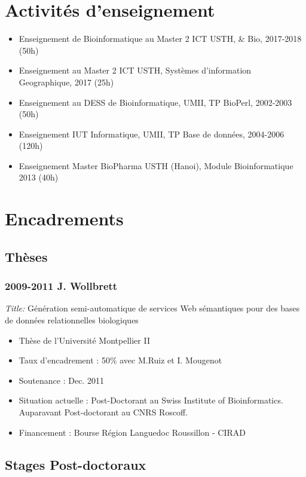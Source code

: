 \section{Activités d’enseignement}
\begin{itemize}
\item Enseignement de Bioinformatique au Master 2 ICT USTH, \& Bio, 2017-2018 (50h)
\item Enseignement au Master 2 ICT USTH, Systèmes d’information Geographique, 2017 (25h)
\item Enseignement au DESS de Bioinformatique, UMII, TP BioPerl, 2002-2003 (50h)
\item Enseignement IUT Informatique, UMII, TP Base de données, 2004-2006 (120h)
\item Enseignement Master BioPharma USTH (Hanoi), Module Bioinformatique 2013 (40h)
\end{itemize}


\section{Encadrements}

\subsection*{Thèses}

\subsubsection*{2009-2011 J. Wollbrett}
\textit{Title:} Génération semi-automatique de services Web sémantiques pour des bases de données relationnelles biologiques

\begin{itemize}
\item Thèse de l’Université Montpellier II
\item Taux d’encadrement : 50\% avec M.Ruiz et I. Mougenot
\item Soutenance : Dec. 2011
\item Situation actuelle : Post-Doctorant au Swiss Institute of Bioinformatics. Auparavant Post-doctorant au CNRS Roscoff.
\item Financement : Bourse Région Languedoc Roussillon - CIRAD

\end{itemize}


\subsection*{Stages Post-doctoraux}

